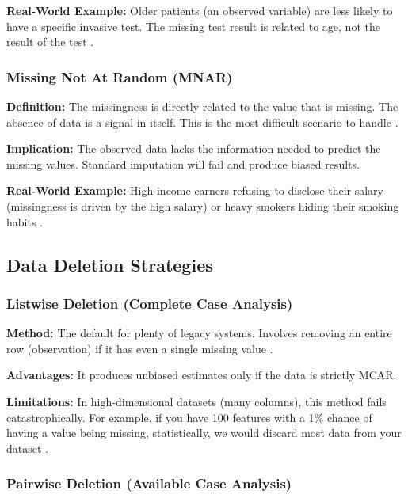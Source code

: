 \documentclass[journal]{IEEEtran}
\begin{document}
\noindent \textbf{Real-World Example:} Older patients (an observed variable) are less likely to have a specific invasive test. The missing test result is related to age, not the result of the test \cite{zhou2024comprehensive}.

\subsubsection{Missing Not At Random (MNAR)}

\noindent \textbf{Definition:} The missingness is directly related to the value that is missing. The absence of data is a signal in itself. This is the most difficult scenario to handle \cite{kang2013prevention}.

\noindent \textbf{Implication:} The observed data lacks the information needed to predict the missing values. Standard imputation will fail and produce biased results.

\noindent \textbf{Real-World Example:} High-income earners refusing to disclose their salary (missingness is driven by the high salary) or heavy smokers hiding their smoking habits \cite{zhou2024comprehensive}.

\subsection{Data Deletion Strategies}

\subsubsection{Listwise Deletion (Complete Case Analysis)}

\noindent \textbf{Method:} The default for plenty of legacy systems. Involves removing an entire row (observation) if it has even a single missing value \cite{meng2025comparative}.

\noindent \textbf{Advantages:} It produces unbiased estimates only if the data is strictly MCAR.

\noindent \textbf{Limitations:} In high-dimensional datasets (many columns), this method fails catastrophically. For example, if you have 100 features with a 1\% chance of having a value being missing, statistically, we would discard most data from your dataset \cite{chen2022handling}.

\subsubsection{Pairwise Deletion (Available Case Analysis)}
\end{document}
